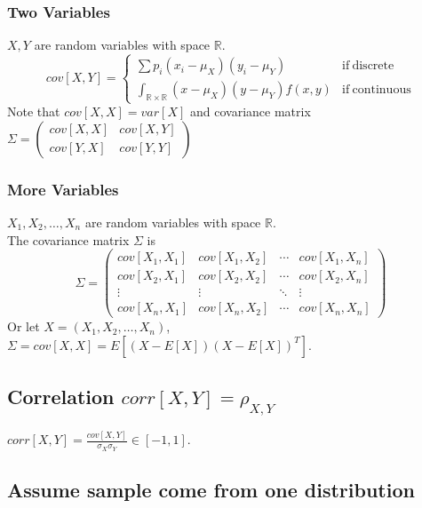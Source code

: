 \documentclass[../main.tex]{subfiles}
\begin{document}
            \subsubsection{Two Variables}
                $X,Y$ are random variables with space $\mathbb{R}$.
                \[
                cov[X,Y]=\left\{\begin{array}{ll}
                        \sum p_i(x_i-\mu_X)(y_i-\mu_Y)& \mathrm{if~discrete} \\[0.2cm]
                        \int_{\mathbb{R}\times\mathbb{R}}(x-\mu_X)(y-\mu_Y)f(x,y) & \mathrm{if~continuous}
                \end{array}\right.
                \]
                Note that $cov[X,X]=var[X]$ and covariance matrix
                $
                    \Sigma = \begin{pmatrix}
                        cov[X,X] & cov[X,Y]\\
                        cov[Y,X] & cov[Y,Y]
                    \end{pmatrix}
                $
            \subsubsection{More Variables}
                $X_1,X_2,\dots,X_n$ are random variables with space $\mathbb{R}$.\\
                The covariance matrix $\Sigma$ is
                \[
                    \Sigma = \begin{pmatrix}
                        cov[X_1,X_1] & cov[X_1,X_2] & \cdots & cov[X_1,X_n]\\
                        cov[X_2,X_1] & cov[X_2,X_2] & \cdots & cov[X_2,X_n]\\
                        \vdots & \vdots & \ddots & \vdots\\
                        cov[X_n,X_1] & cov[X_n,X_2] & \cdots & cov[X_n,X_n]
                    \end{pmatrix}
                \]
                Or let $X=(X_1,X_2,\dots,X_n)$, $\Sigma=cov[X,X]=E[(X-E[X])(X-E[X])^T]$.
                
        \subsection{Correlation \texorpdfstring{$corr[X,Y]=\rho_{X,Y}$}{}}
            $corr[X,Y]=\frac{cov[X,Y]}{\sigma_X \sigma_Y}\in[-1,1]$.
        \subsection{Assume sample come from one distribution}
\end{document}
